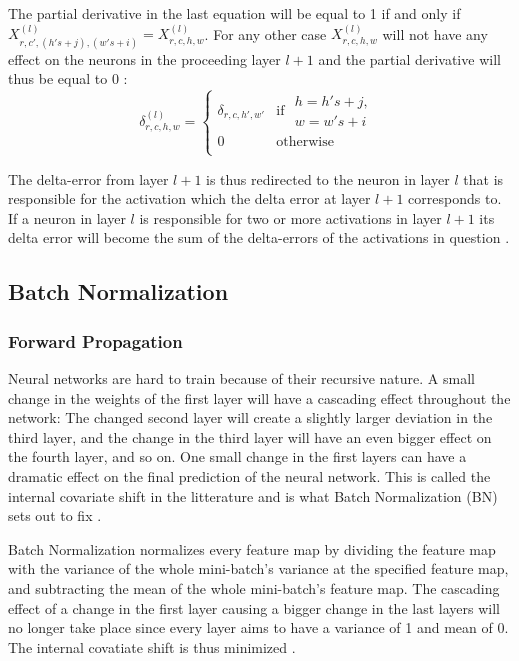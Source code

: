\documentclass[a4paper, twoside]{article}
\begin{document}
The partial derivative in the last equation will be equal to 1 if and only if $X^{(l)}_{r,c',(h's+j),(w's+i)} = X^{(l)}_{r,c,h,w}$. For any other case $X^{(l)}_{r,c,h,w}$ will not have any effect on the neurons in the proceeding layer $l+1$ and the partial derivative will thus be equal to 0 \cite{cs231n} \cite{convmath} \cite{webconv3}:
\begin{equation}
\delta^{(l)}_{r,c,h,w} = \begin{cases}
				\delta_{r,c,h',w'} & \mbox{if } \begin{split} h = h's+j, \\w = w's+i \end{split}\\
				0 & \mbox{otherwise}\\
			\end{cases}
\end{equation}

The delta-error from layer $l+1$ is thus redirected to the neuron in layer $l$ that is responsible for the activation which the delta error at layer $l+1$ corresponds to. If a neuron in layer $l$ is responsible for two or more activations in layer $l+1$ its delta error will become the sum of the delta-errors of the activations in question \cite{cs231n} \cite{convmath} \cite{webconv3}. 

\subsection{Batch Normalization}
\subsubsection{Forward Propagation}
Neural networks are hard to train because of their recursive nature. A small change in the weights of the first layer will have a cascading effect throughout the network: The changed second layer will create a slightly larger deviation in the third layer, and the change in the third layer will have an even bigger effect on the fourth layer, and so on. One small change in the first layers can have a dramatic effect on the final prediction of the neural network. This is called  the internal covariate shift in the litterature and is what Batch Normalization (BN) sets out to fix \cite{cs231n} \cite{batchnorm}. 

Batch Normalization normalizes every feature map by dividing the feature map with the variance of the whole mini-batch's variance at the specified feature map, and subtracting the mean of the whole mini-batch's feature map. The cascading effect of a change in the first layer causing a bigger change in the last layers will no longer take place since every layer aims to have a variance of 1 and mean of 0. The internal covatiate shift is thus minimized \cite{cs231n} \cite{batchnorm}. 
\end{document}
